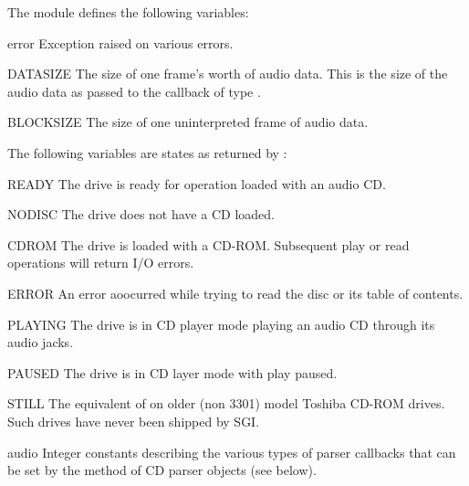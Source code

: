The module defines the following variables:

\begin{excdesc}{error}
Exception raised on various errors.
\end{excdesc}

\begin{datadesc}{DATASIZE}
The size of one frame's worth of audio data.  This is the size of the
audio data as passed to the callback of type .
\end{datadesc}

\begin{datadesc}{BLOCKSIZE}
The size of one uninterpreted frame of audio data.
\end{datadesc}

The following variables are states as returned by
:

\begin{datadesc}{READY}
The drive is ready for operation loaded with an audio CD.
\end{datadesc}

\begin{datadesc}{NODISC}
The drive does not have a CD loaded.
\end{datadesc}

\begin{datadesc}{CDROM}
The drive is loaded with a CD-ROM.  Subsequent play or read operations
will return I/O errors.
\end{datadesc}

\begin{datadesc}{ERROR}
An error aoocurred while trying to read the disc or its table of
contents.
\end{datadesc}

\begin{datadesc}{PLAYING}
The drive is in CD player mode playing an audio CD through its audio
jacks.
\end{datadesc}

\begin{datadesc}{PAUSED}
The drive is in CD layer mode with play paused.
\end{datadesc}

\begin{datadesc}{STILL}
The equivalent of  on older (non 3301) model Toshiba
CD-ROM drives.  Such drives have never been shipped by SGI.
\end{datadesc}

\begin{datadesc}{audio}
Integer constants describing the various types of parser callbacks
that can be set by the  method of CD parser
objects (see below).
\end{datadesc}


